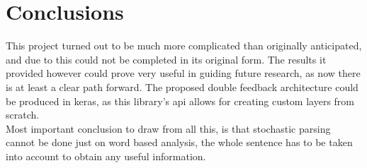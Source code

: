 \chapter{Conclusions}
This project turned out to be much more complicated than originally anticipated, and due to this could not be completed in its original form.
The results it provided however could prove very useful in guiding future research, as now there is at least a clear path forward. The proposed
double feedback architecture could be produced in keras, as this library's api allows for creating custom layers from scratch. \\
Most important conclusion to draw from all this, is that stochastic parsing cannot be done just on word based analysis, the whole sentence has
to be taken into account to obtain any useful information.

